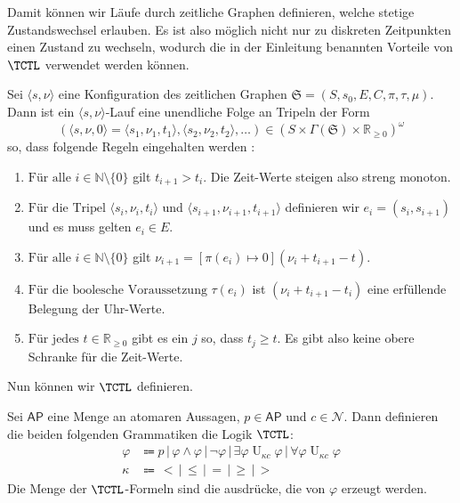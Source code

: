 Damit können wir Läufe durch zeitliche Graphen definieren, welche stetige Zustandswechsel erlauben. 
Es ist also möglich nicht nur zu diskreten Zeitpunkten einen Zustand zu wechseln, wodurch die in der Einleitung benannten Vorteile von $\TCTL$ verwendet werden können.

\begin{definition}
	Sei $\langle s,\nu \rangle$ eine Konfiguration des zeitlichen Graphen $\mathfrak{S}=(S,s_0,E,C,\pi,\tau,\mu)$. Dann ist ein $\langle s,\nu \rangle$-Lauf eine unendliche Folge an Tripeln der Form 
	$$(\langle s,\nu,0\rangle = \langle s_1,\nu_1,t_1\rangle,\langle s_2,\nu_2,t_2\rangle,\dots)\in (S\times \Gamma(\mathfrak{S})\times \mathbb{R}_{\geq 0})^\omega$$ 
	so, dass folgende Regeln eingehalten werden \cite{alur1990model}:
	\begin{enumerate}
		\item $\text{Für alle } i\in \mathbb{N}\setminus\{0\}$ gilt $t_{i+1}>t_i$. Die Zeit-Werte steigen also streng monoton.
		\item $\text{Für die Tripel } \langle s_i,\nu_i,t_i\rangle$ und $\langle s_{i+1},\nu_{i+1},t_{i+1}\rangle$ definieren wir $e_i=(s_i,s_{i+1})$ und es muss gelten $e_i\in E$.
		\item $\text{Für alle } i\in \mathbb{N}\setminus \{0\}$ gilt $\nu_{i+1}=[\pi(e_i)\mapsto 0](\nu_i+t_{i+1}-t)$.
		\item $\text{Für die boolesche Voraussetzung } \tau(e_i)$ ist $(\nu_i + t_{i+1}-t_i)$ eine erfüllende Belegung der Uhr-Werte.
		\item $\text{Für jedes } t\in \mathbb{R}_{\geq 0}$ gibt es ein $j$ so, dass $t_j\geq t$. Es gibt also keine obere Schranke für die Zeit-Werte.
	\end{enumerate}
\end{definition}

Nun können wir $\TCTL$ definieren.

\begin{definition}
	Sei $\mathsf{AP}$ eine Menge an atomaren Aussagen, $p\in \mathsf{AP}$ und $c\in \mathcal{N}$. Dann definieren die beiden folgenden Grammatiken die Logik $\TCTL$:
	\begin{align*}
		\varphi &\Coloneqq p \,|\, \varphi \land \varphi \,|\, \neg\varphi \,|\, \exists\varphi \operatorname{U}_{\kappa c}\varphi \,|\, \forall\varphi \operatorname{U}_{\kappa c}\varphi \\
		\kappa &\Coloneqq \, < \,|\, \leq \,|\, = \,|\, \geq \,|\, >
	\end{align*}
	Die Menge der $\TCTL$-Formeln sind die ausdrücke, die von $\varphi$ erzeugt werden. \cite{alur1990model}
\end{definition}

